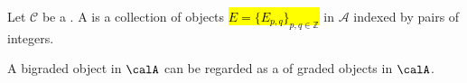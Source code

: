 \begin{definition} \label{definition:bigraded_object_in_a_category}
    Let $\mathcal{C}$ be a .
    A  is a collection of objects \hl{$E = \{E_{p,q}\}_{p,q \in \mathbb{Z}}$} in $\mathcal{A}$ indexed by pairs of integers.

    A bigraded object in $\calA$ can be regarded as a  of graded objects in $\calA$.
\end{definition}